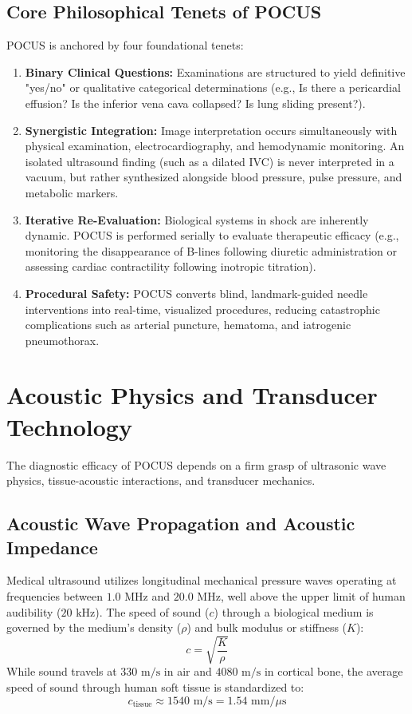 \documentclass[11pt,a4paper]{article}
\begin{document}
\subsection{Core Philosophical Tenets of POCUS}
POCUS is anchored by four foundational tenets:
\begin{enumerate}[leftmargin=2em]
    \item \textbf{Binary Clinical Questions:} Examinations are structured to yield definitive "yes/no" or qualitative categorical determinations (e.g., Is there a pericardial effusion? Is the inferior vena cava collapsed? Is lung sliding present?).
    \item \textbf{Synergistic Integration:} Image interpretation occurs simultaneously with physical examination, electrocardiography, and hemodynamic monitoring. An isolated ultrasound finding (such as a dilated IVC) is never interpreted in a vacuum, but rather synthesized alongside blood pressure, pulse pressure, and metabolic markers.
    \item \textbf{Iterative Re-Evaluation:} Biological systems in shock are inherently dynamic. POCUS is performed serially to evaluate therapeutic efficacy (e.g., monitoring the disappearance of B-lines following diuretic administration or assessing cardiac contractility following inotropic titration).
    \item \textbf{Procedural Safety:} POCUS converts blind, landmark-guided needle interventions into real-time, visualized procedures, reducing catastrophic complications such as arterial puncture, hematoma, and iatrogenic pneumothorax.
\end{enumerate}

\section{Acoustic Physics and Transducer Technology}
The diagnostic efficacy of POCUS depends on a firm grasp of ultrasonic wave physics, tissue-acoustic interactions, and transducer mechanics.

\subsection{Acoustic Wave Propagation and Acoustic Impedance}
Medical ultrasound utilizes longitudinal mechanical pressure waves operating at frequencies between $1.0\text{ MHz}$ and $20.0\text{ MHz}$, well above the upper limit of human audibility ($20\text{ kHz}$). The speed of sound ($c$) through a biological medium is governed by the medium's density ($\rho$) and bulk modulus or stiffness ($K$):
\begin{equation}
    c = \sqrt{\frac{K}{\rho}}
\end{equation}
While sound travels at $330\text{ m/s}$ in air and $4080\text{ m/s}$ in cortical bone, the average speed of sound through human soft tissue is standardized to:
\begin{equation}
    c_{\text{tissue}} \approx 1540\text{ m/s} = 1.54\text{ mm}/\mu\text{s}
\end{equation}
\end{document}
